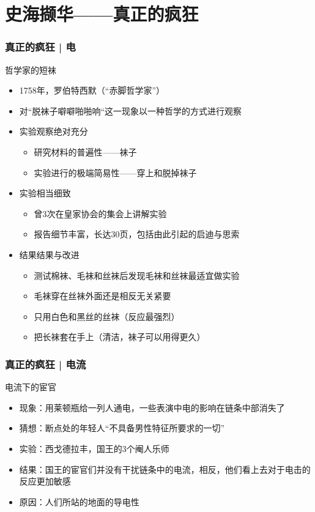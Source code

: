 \section{史海撷华——真正的疯狂}
\begin{frame}
  \frametitle{真正的疯狂 | 电}
  \begin{block}{哲学家的短袜}
    \begin{itemize}
      \item 1758年，罗伯特\textbullet 西默（“赤脚哲学家”）
      \item 对“脱袜子噼噼啪啪响“这一现象以一种哲学的方式进行观察
      \pause
      \item 实验观察绝对充分
        \begin{itemize}
          \item 研究材料的普遍性——袜子
          \item 实验进行的极端简易性——穿上和脱掉袜子
        \end{itemize}
      \item 实验相当细致
        \begin{itemize}
          \item 曾3次在皇家协会的集会上讲解实验
          \item 报告细节丰富，长达30页，包括由此引起的启迪与思索
        \end{itemize}
      \item 结果结果与改进
        \begin{itemize}
          \item 测试棉袜、毛袜和丝袜后发现毛袜和丝袜最适宜做实验
          \item 毛袜穿在丝袜外面还是相反无关紧要
          \item 只用白色和黑丝的丝袜（反应最强烈）
          \item 把长袜套在手上（清洁，袜子可以用得更久）
        \end{itemize}
    \end{itemize}
  \end{block}
\end{frame}

\begin{frame}
  \frametitle{真正的疯狂 | 电流}
  \begin{block}{电流下的宦官}
    \begin{itemize}
      \item 现象：用莱顿瓶给一列人通电，一些表演中电的影响在链条中部消失了
      \pause
      \item 猜想：断点处的年轻人“不具备男性特征所要求的一切”
      \item 实验：西戈\textbullet 德拉丰，国王的3个阉人乐师
      \item 结果：国王的宦官们并没有干扰链条中的电流，相反，他们看上去对于电击的反应更加敏感
      \item 原因：人们所站的地面的导电性
    \end{itemize}
  \end{block}
\end{frame}

